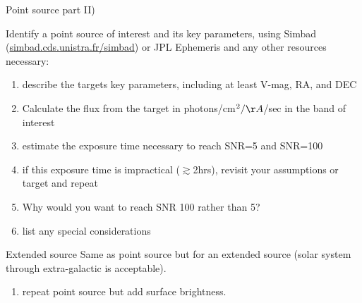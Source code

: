 \begin{frame}{Point source part II)}

Identify a point source of interest and its key parameters, using Simbad (\url{simbad.cds.unistra.fr/simbad}) or JPL Ephemeris and any other resources necessary:

 \begin{enumerate}
\item describe the targets key parameters, including at least V-mag, RA, and DEC
\item Calculate the flux from the target in photons/cm$^2/\AA $/sec in the band of interest
 \item estimate the exposure time necessary to reach SNR=5 and SNR=100
 \item if this exposure time is impractical ($\gtrsim$2hrs), revisit your assumptions or target and repeat
 \item Why would you want to reach SNR 100 rather than 5?
 \item list any special considerations
\end{enumerate}
\end{frame}

\begin{frame}{Extended source}
Same as point source but for an extended source (solar system through extra-galactic is acceptable).

 \begin{enumerate}
 \item repeat point source but add surface brightness.
\end{enumerate}
\end{frame}





